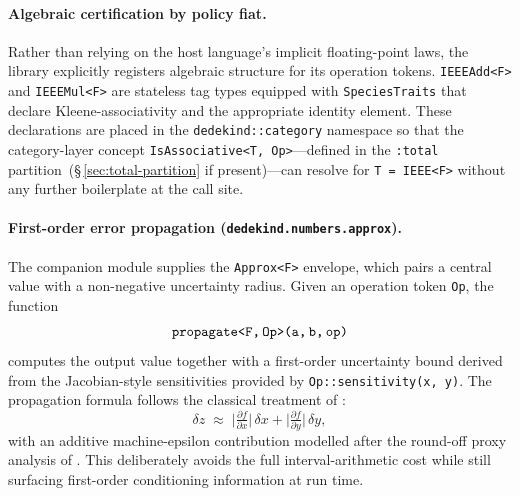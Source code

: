 \documentclass[11pt, a4paper]{report}
\begin{document}
\paragraph{Algebraic certification by policy fiat.}
Rather than relying on the host language's implicit floating-point laws, the library explicitly registers algebraic structure for its operation tokens.
\texttt{IEEEAdd<F>} and \texttt{IEEEMul<F>} are stateless tag types equipped with \texttt{SpeciesTraits} that declare Kleene-associativity and the appropriate identity element.
These declarations are placed in the \texttt{dedekind::category} namespace so that the category-layer concept \texttt{IsAssociative<T, Op>}---defined in the \texttt{:total} partition~(\S\,\ref{sec:total-partition} if present)---can resolve for \texttt{T = IEEE<F>} without any further boilerplate at the call site.

\paragraph{First-order error propagation (\texttt{dedekind.numbers.approx}).}
The companion module supplies the \texttt{Approx<F>} envelope, which pairs a central value with a non-negative uncertainty radius.
Given an operation token \texttt{Op}, the function
\begin{equation}
  \texttt{propagate<F,\,Op>(a,\,b,\,op)}
\end{equation}
computes the output value together with a first-order uncertainty bound derived from the Jacobian-style sensitivities provided by \texttt{Op::sensitivity(x,\,y)}.
The propagation formula follows the classical treatment of \textcite{ku1966notes}:
\begin{equation}
  \delta z \;\approx\; \bigl|\tfrac{\partial f}{\partial x}\bigr|\,\delta x
                    + \bigl|\tfrac{\partial f}{\partial y}\bigr|\,\delta y ,
\end{equation}
with an additive machine-epsilon contribution modelled after the round-off proxy analysis of \textcite{higham2002accuracy}.
This deliberately avoids the full interval-arithmetic cost \cite{goodman1960exact} while still surfacing first-order conditioning information at run time.
\end{document}
